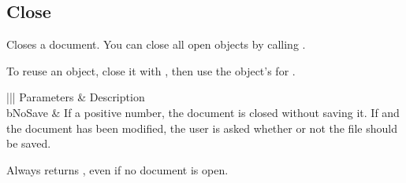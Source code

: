 \documentclass[letterpaper,12pt,english,openany,oneside]{sphinxmanual}
\begin{document}
\subsection{Close}
\label{\detokenize{IAC_API_OLE_Objects:close}}
Closes a document. You can close all open  objects by calling   .

To reuse an  object, close it with   , then use the  object’s  for   .


\begin{sphinxVerbatim}[commandchars=\\\{\}]
  
\end{sphinxVerbatim}
\label{\detokenize{IAC_API_OLE_Objects:parameters-19}}


\begin{savenotes}\sphinxattablestart
\centering
{}\label{\detokenize{IAC_API_OLE_Objects:section-22}}\nobreak
\begin{tabular}[t]{|||}
\hline
\sphinxstyletheadfamily 
Parameters
&\sphinxstyletheadfamily 
Description
\\
\hline
bNoSave
&
If a positive number, the document is closed without saving it. If  and the document has been modified, the user is asked whether or not the file should be saved.
\\
\hline
\end{tabular}
\par
\sphinxattableend\end{savenotes}


Always returns , even if no document is open.
\end{document}
